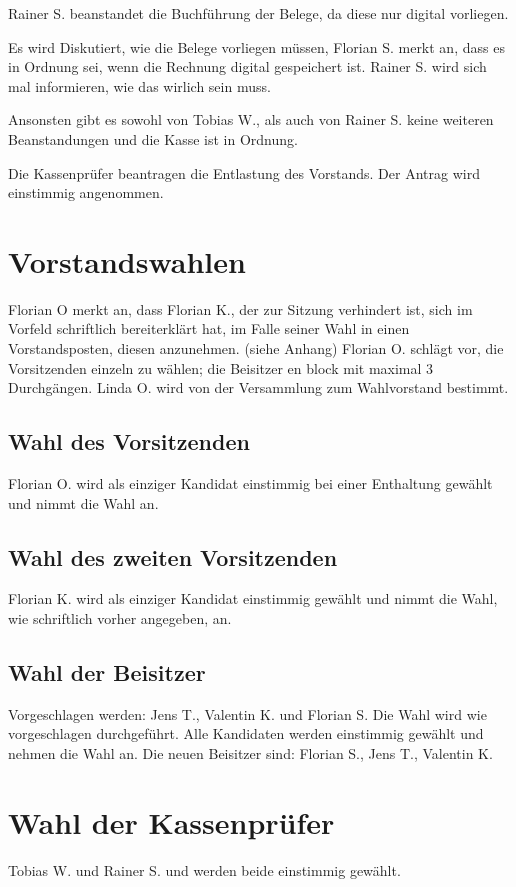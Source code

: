 Rainer S. beanstandet die Buchführung der Belege, da diese nur digital vorliegen.

Es wird Diskutiert, wie die Belege vorliegen müssen, Florian S. merkt an, dass es in Ordnung sei, wenn die Rechnung digital gespeichert ist. Rainer S. wird sich mal informieren, wie das wirlich sein muss.

Ansonsten gibt es sowohl von Tobias W., als auch von Rainer S. keine weiteren Beanstandungen und die Kasse ist in Ordnung.

Die Kassenprüfer beantragen die Entlastung  des Vorstands.
Der Antrag wird einstimmig angenommen.

\section{Vorstandswahlen}
 Florian O merkt an, dass Florian K., der zur Sitzung verhindert ist, sich im Vorfeld schriftlich bereiterklärt hat, im Falle seiner Wahl in einen Vorstandsposten, diesen anzunehmen. (siehe Anhang)
 Florian O. schlägt vor, die Vorsitzenden einzeln zu wählen; die Beisitzer en block mit maximal 3 Durchgängen.
 Linda O. wird von der Versammlung zum Wahlvorstand bestimmt.
\subsection{Wahl des Vorsitzenden}
 Florian O. wird als einziger Kandidat einstimmig bei einer Enthaltung gewählt und nimmt die Wahl an. 
\subsection{Wahl des zweiten Vorsitzenden}         
 Florian K. wird als einziger Kandidat einstimmig gewählt und nimmt die Wahl, wie schriftlich vorher angegeben, an. 
\subsection{Wahl der Beisitzer}
  Vorgeschlagen werden: Jens T., Valentin K. und Florian S.
  Die Wahl wird wie vorgeschlagen durchgeführt. 
  Alle Kandidaten werden einstimmig gewählt und nehmen die Wahl an. 
  Die neuen Beisitzer sind: Florian S., Jens T., Valentin K.

\section{Wahl der Kassenprüfer}
 Tobias W. und Rainer S. und werden beide einstimmig gewählt. 
 
